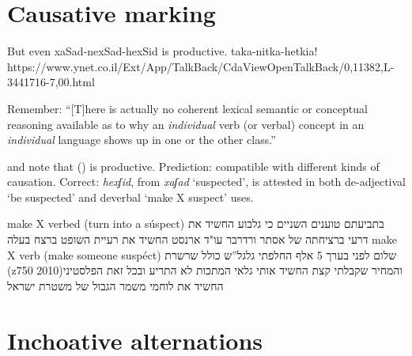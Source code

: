 \section{Causative marking}


	But even xaSad-nexSad-hexSid is productive. taka-nitka-hetkia! https://www.ynet.co.il/Ext/App/TalkBack/CdaViewOpenTalkBack/0,11382,L-3441716-7,00.html

Remember: ``[T]here is actually no coherent lexical semantic or conceptual reasoning available as to why an \emph{individual} verb (or verbal) concept in an \emph{individual} language shows up in one or the other class.'' \citep[65]{layering15}
	

\pex \cite{lev16} and \cite{kastner18tlr} note that {\thif} (\vd) is productive.
	\a Prediction: compatible with different kinds of causation.
	\a Correct: \emph{hexʃid}, from \emph{xaʃad} `suspected', is attested in both de-adjectival `be suspected' and deverbal `make X suspect' uses.
\xe	

make X verbed (turn into a súspect)
בתביעתם טוענים השניים כי גלבוע החשיד את דרעי ברציחתה של אסתר ורדרבר
עו"ד ארנסט החשיד את רעיית השופט ברצח בעלה
make X verb (make someone suspéct)
שלום לפני בערך 5 אלף החלפתי גלגל''ש כולל שרשרת (z750 2010)והמחיר שקבלתי קצת החשיד אותי
גלאי המתכות לא התריע ובכל זאת הפלסטיני החשיד את לוחמי משמר הגבול של משטרת ישראל


\section{Inchoative alternations}



